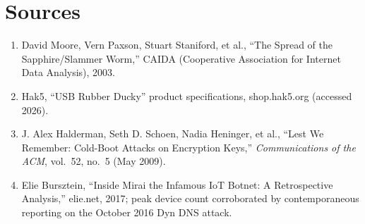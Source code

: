 \section*{Sources}
\begin{enumerate}[label=\lbrack\arabic*\rbrack, leftmargin=2.2em]
\item {}David Moore, Vern Paxson, Stuart Staniford, et al., ``The Spread of the
Sapphire/Slammer Worm,'' CAIDA (Cooperative Association for Internet Data Analysis), 2003.
\item {}Hak5, ``USB Rubber Ducky'' product specifications, shop.hak5.org (accessed
2026).
\item {}J. Alex Halderman, Seth D. Schoen, Nadia Heninger, et al., ``Lest We
Remember: Cold-Boot Attacks on Encryption Keys,'' \emph{Communications of the ACM}, vol.\ 52,
no.\ 5 (May 2009).
\item {}Elie Bursztein, ``Inside Mirai the Infamous IoT Botnet: A Retrospective
Analysis,'' elie.net, 2017; peak device count corroborated by contemporaneous reporting on the
October 2016 Dyn DNS attack.
\end{enumerate}

